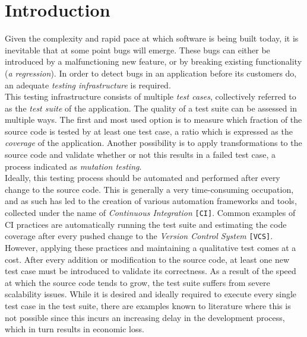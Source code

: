 
\chapter{Introduction}
Given the complexity and rapid pace at which software is being built today, it is inevitable that at some point bugs will emerge. These bugs can either be introduced by a malfunctioning new feature, or by breaking existing functionality (\emph{a regression}). In order to detect bugs in an application before its customers do, an adequate \emph{testing infrastructure} is required.\\

\noindent This testing infrastructure consists of multiple \emph{test cases}, collectively referred to as the \emph{test suite} of the application. The quality of a test suite can be assessed in multiple ways. The first and most used option is to measure which fraction of the source code is tested by at least one test case, a ratio which is expressed as the \emph{coverage} of the application. Another possibility is to apply transformations to the source code and validate whether or not this results in a failed test case, a process indicated as \emph{mutation testing}.\\

\noindent Ideally, this testing process should be automated and performed after every change to the source code. This is generally a very time-consuming occupation, and as such has led to the creation of various automation frameworks and tools, collected under the name of \emph{Continuous Integration} \texttt{[CI]}. Common examples of CI practices are automatically running the test suite and estimating the code coverage after every pushed change to the \emph{Version Control System} \texttt{[VCS]}.\\

\noindent However, applying these practices and maintaining a qualitative test comes at a cost. After every addition or modification to the source code, at least one new test case must be introduced to validate its correctness. As a result of the speed at which the source code tends to grow, the test suite suffers from severe scalability issues. While it is desired and ideally required to execute every single test case in the test suite, there are examples known to literature where this is not possible since this incurs an increasing delay in the development process, which in turn results in economic loss.\\

